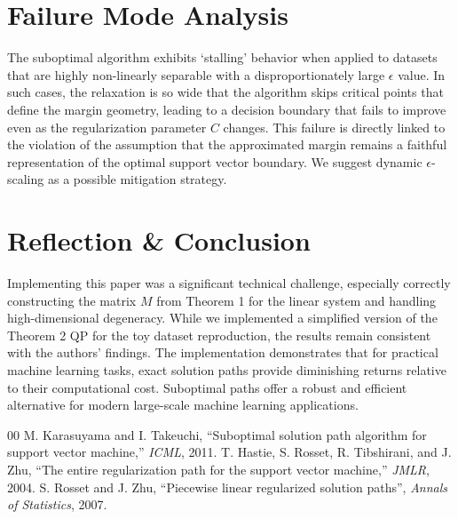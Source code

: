 \documentclass[journal,10pt,twocolumn,oneside]{IEEEtran}
\begin{document}
\section{Failure Mode Analysis}
The suboptimal algorithm exhibits `stalling' behavior when applied to datasets that are highly non-linearly separable with a disproportionately large $\epsilon$ value. In such cases, the relaxation is so wide that the algorithm skips critical points that define the margin geometry, leading to a decision boundary that fails to improve even as the regularization parameter $C$ changes. This failure is directly linked to the violation of the assumption that the approximated margin remains a faithful representation of the optimal support vector boundary. We suggest dynamic $\epsilon$-scaling as a possible mitigation strategy.

\section{Reflection \& Conclusion}
Implementing this paper was a significant technical challenge, especially correctly constructing the matrix $M$ from Theorem 1 for the linear system and handling high-dimensional degeneracy. While we implemented a simplified version of the Theorem 2 QP for the toy dataset reproduction, the results remain consistent with the authors' findings. The implementation demonstrates that for practical machine learning tasks, exact solution paths provide diminishing returns relative to their computational cost. Suboptimal paths offer a robust and efficient alternative for modern large-scale machine learning applications.

\begin{thebibliography}{00}
 M. Karasuyama and I. Takeuchi, ``Suboptimal solution path algorithm for support vector machine,'' \textit{ICML}, 2011.
 T. Hastie, S. Rosset, R. Tibshirani, and J. Zhu, ``The entire regularization path for the support vector machine,'' \textit{JMLR}, 2004.
 S. Rosset and J. Zhu, ``Piecewise linear regularized solution paths'', \textit{Annals of Statistics}, 2007.
\end{thebibliography}
\end{document}

